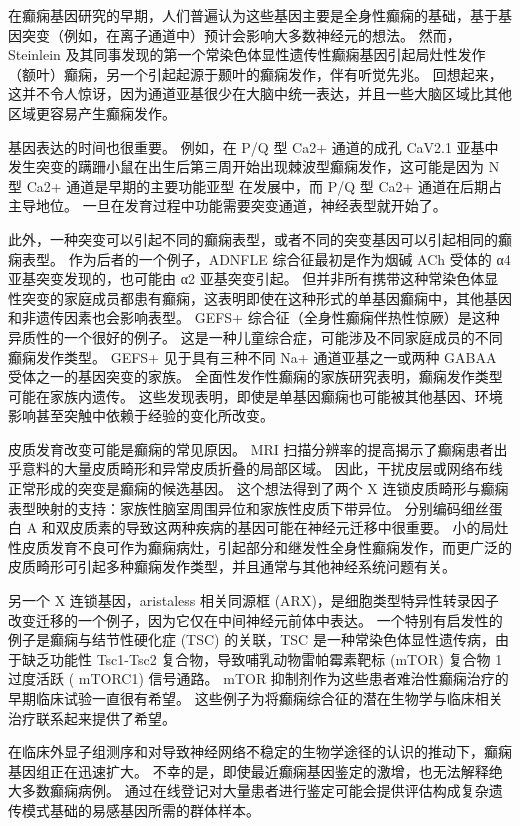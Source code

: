 在癫痫基因研究的早期，人们普遍认为这些基因主要是全身性癫痫的基础，基于基因突变（例如，在离子通道中）预计会影响大多数神经元的想法。 然而，Steinlein 及其同事发现的第一个常染色体显性遗传性癫痫基因引起局灶性发作（额叶）癫痫，另一个引起起源于颞叶的癫痫发作，伴有听觉先兆。 回想起来，这并不令人惊讶，因为通道亚基很少在大脑中统一表达，并且一些大脑区域比其他区域更容易产生癫痫发作。

基因表达的时间也很重要。 例如，在 P/Q 型 Ca2+ 通道的成孔 CaV2.1 亚基中发生突变的蹒跚小鼠在出生后第三周开始出现棘波型癫痫发作，这可能是因为 N 型 Ca2+ 通道是早期的主要功能亚型 在发展中，而 P/Q 型 Ca2+ 通道在后期占主导地位。 一旦在发育过程中功能需要突变通道，神经表型就开始了。

此外，一种突变可以引起不同的癫痫表型，或者不同的突变基因可以引起相同的癫痫表型。 作为后者的一个例子，ADNFLE 综合征最初是作为烟碱 ACh 受体的 α4 亚基突变发现的，也可能由 α2 亚基突变引起。 但并非所有携带这种常染色体显性突变的家庭成员都患有癫痫，这表明即使在这种形式的单基因癫痫中，其他基因和非遗传因素也会影响表型。 GEFS+ 综合征（全身性癫痫伴热性惊厥）是这种异质性的一个很好的例子。 这是一种儿童综合症，可能涉及不同家庭成员的不同癫痫发作类型。 GEFS+ 见于具有三种不同 Na+ 通道亚基之一或两种 GABAA 受体之一的基因突变的家族。 全面性发作性癫痫的家族研究表明，癫痫发作类型可能在家族内遗传。 这些发现表明，即使是单基因癫痫也可能被其他基因、环境影响甚至突触中依赖于经验的变化所改变。

皮质发育改变可能是癫痫的常见原因。 MRI 扫描分辨率的提高揭示了癫痫患者出乎意料的大量皮质畸形和异常皮质折叠的局部区域。 因此，干扰皮层或网络布线正常形成的突变是癫痫的候选基因。 这个想法得到了两个 X 连锁皮质畸形与癫痫表型映射的支持：家族性脑室周围异位和家族性皮质下带异位。 分别编码细丝蛋白 A 和双皮质素的导致这两种疾病的基因可能在神经元迁移中很重要。 小的局灶性皮质发育不良可作为癫痫病灶，引起部分和继发性全身性癫痫发作，而更广泛的皮质畸形可引起多种癫痫发作类型，并且通常与其他神经系统问题有关。

另一个 X 连锁基因，aristaless 相关同源框 (ARX)，是细胞类型特异性转录因子改变迁移的一个例子，因为它仅在中间神经元前体中表达。 一个特别有启发性的例子是癫痫与结节性硬化症 (TSC) 的关联，TSC 是一种常染色体显性遗传病，由于缺乏功能性 Tsc1-Tsc2 复合物，导致哺乳动物雷帕霉素靶标 (mTOR) 复合物 1 过度活跃 ( mTORC1) 信号通路。 mTOR 抑制剂作为这些患者难治性癫痫治疗的早期临床试验一直很有希望。 这些例子为将癫痫综合征的潜在生物学与临床相关治疗联系起来提供了希望。

在临床外显子组测序和对导致神经网络不稳定的生物学途径的认识的推动下，癫痫基因组正在迅速扩大。 不幸的是，即使最近癫痫基因鉴定的激增，也无法解释绝大多数癫痫病例。 通过在线登记对大量患者进行鉴定可能会提供评估构成复杂遗传模式基础的易感基因所需的群体样本。


